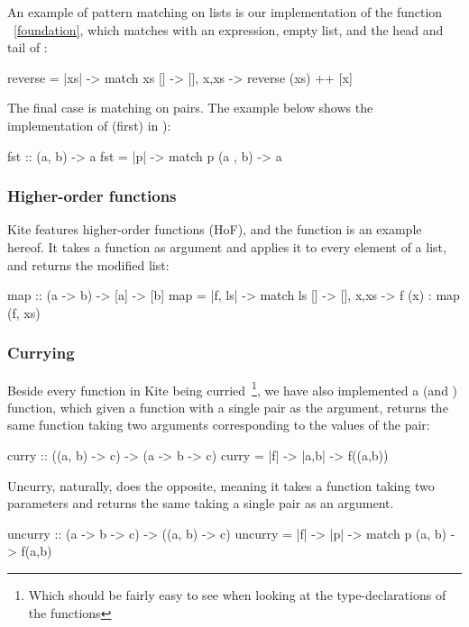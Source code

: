 An example of pattern matching on lists is our implementation of the function ~\ref{foundation}, which matches  with an expression, empty list, and the head and tail of :

\begin{kite}
reverse = |xs| -> {
  match xs {
    []    -> [],
    x,xs  -> reverse (xs) ++ [x]
  }
}
\end{kite}

The final case is matching on pairs. The example below shows the implementation of  (first) in ):
\begin{kite}
fst :: (a, b) -> a
fst = |p| -> {
  match p {
    (a , b) -> a
  }
}
\end{kite}

\subsubsection{Higher-order functions}
Kite features higher-order functions (HoF), and the  function is an example hereof. It takes a function as argument and applies it to every element of a list, and returns the modified list:

\begin{kite}
map :: (a -> b) -> [a] -> [b]
map = |f, ls| -> {
  match ls {
    [] -> [],
    x,xs -> f (x) : map (f, xs)
  }
}
\end{kite}

\subsubsection{Currying}
\label{subsubsec:currying}
Beside every function in Kite being curried~\footnote{Which should be fairly easy to see when looking at the type-declarations of the functions}, we have also implemented a  (and ) function, which given a function with a single pair as the argument, returns the same function taking two arguments corresponding to the values of the pair:

\begin{kite}
curry :: ((a, b) -> c) -> (a -> b -> c)
curry = |f| -> {
  |a,b| -> {
    f((a,b))
  }
}
\end{kite}

Uncurry, naturally, does the opposite, meaning it takes a function taking two parameters and returns the same taking a single pair as an argument.

\begin{kite}
uncurry :: (a -> b -> c) -> ((a, b) -> c)
uncurry = |f| -> {
  |p| -> {
    match p {
      (a, b) -> f(a,b)
    }
  }
}
\end{kite}


